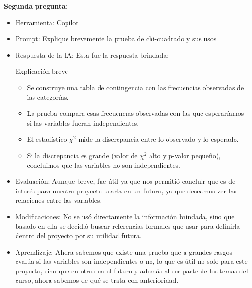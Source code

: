 \documentclass[12pt]{article}
\begin{document}
\textbf{Segunda pregunta:}
\begin{itemize}
    \item Herramienta: Copilot  
    \item Prompt: Explique brevemente la prueba de chi-cuadrado y sus usos 
    \item Respuesta de la IA: Esta fue la respuesta brindada: 
    
Explicación breve 
      \begin{itemize}
          \item Se construye una tabla de contingencia con las frecuencias observadas de las categorías.  
          \item La prueba compara esas frecuencias observadas con las que esperaríamos si las variables fueran independientes. 
          \item El estadístico $\chi ^2$ mide la discrepancia entre lo observado y lo esperado. 
          \item Si la discrepancia es grande (valor de $\chi ^2$ alto y p-valor pequeño), concluimos que las variables no son independientes. 
      \end{itemize}
 
    \item Evaluación: Aunque breve, fue útil ya que nos permitió concluir que es de interés para nuestro proyecto usarla en un futuro, ya que deseamos ver las relaciones entre las variables.
    \item Modificaciones: No se usó directamente la información brindada, sino que basado en ella se decidió buscar referencias formales que usar para definirla dentro del proyecto por su utilidad futura.  
    \item Aprendizaje: Ahora sabemos que existe una prueba que a grandes rasgos evalúa si las variables son independientes o no, lo que es útil no solo para este proyecto, sino que en otros en el futuro y además al ser parte de los temas del curso, ahora sabemos de qué se trata con anterioridad. 
\end{itemize}
\end{document}
